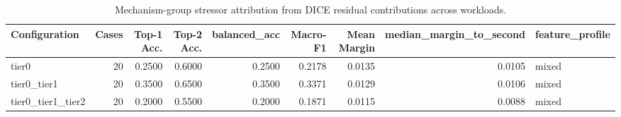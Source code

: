 \begin{table}[t]
\centering
\caption{Mechanism-group stressor attribution from DICE residual contributions across workloads.}
\label{tab:dice_stressor_diagnosis}
\footnotesize
\begin{tabular}{lrrrrrrrl}
\toprule
Configuration & Cases & Top-1 Acc. & Top-2 Acc. & balanced_acc & Macro-F1 & Mean Margin & median_margin_to_second & feature_profile \\
\midrule
tier0 & 20 & 0.2500 & 0.6000 & 0.2500 & 0.2178 & 0.0135 & 0.0105 & mixed \\
tier0_tier1 & 20 & 0.3500 & 0.6500 & 0.3500 & 0.3371 & 0.0129 & 0.0106 & mixed \\
tier0_tier1_tier2 & 20 & 0.2000 & 0.5500 & 0.2000 & 0.1871 & 0.0115 & 0.0088 & mixed \\
\bottomrule
\end{tabular}

\end{table}
